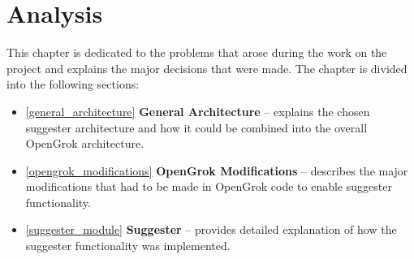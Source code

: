 \chapter{Analysis}
\label{chap:analysis}

This chapter is dedicated to the problems that arose during the work on the project and explains the major decisions
that were made. The chapter is divided into the following sections:
\begin{itemize}
    \item \ref{general_architecture} \textbf{General Architecture} – explains the chosen suggester architecture and
    how it could be combined into the overall OpenGrok architecture.
    \item \ref{opengrok_modifications} \textbf{OpenGrok Modifications} – describes the major modifications that had
    to be made in OpenGrok code to enable suggester functionality.
    \item \ref{suggester_module} \textbf{Suggester} – provides detailed explanation of how the suggester functionality
    was implemented.
\end{itemize}

